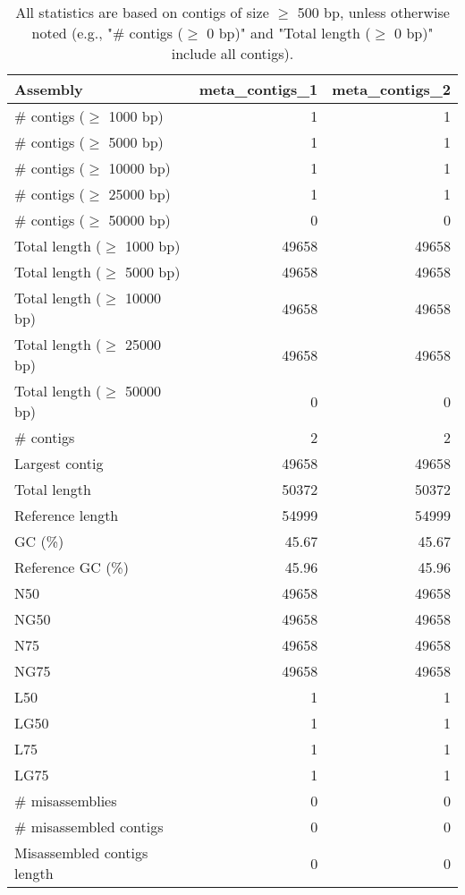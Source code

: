 \documentclass[12pt,a4paper]{article}
\begin{document}
\begin{table}[ht]
\begin{center}
\caption{All statistics are based on contigs of size $\geq$ 500 bp, unless otherwise noted (e.g., "\# contigs ($\geq$ 0 bp)" and "Total length ($\geq$ 0 bp)" include all contigs).}
\begin{tabular}{|l*{2}{|r}|}
\hline
Assembly & meta\_contigs\_1 & meta\_contigs\_2 \\ \hline
\# contigs ($\geq$ 1000 bp) & 1 & 1 \\ \hline
\# contigs ($\geq$ 5000 bp) & 1 & 1 \\ \hline
\# contigs ($\geq$ 10000 bp) & 1 & 1 \\ \hline
\# contigs ($\geq$ 25000 bp) & 1 & 1 \\ \hline
\# contigs ($\geq$ 50000 bp) & 0 & 0 \\ \hline
Total length ($\geq$ 1000 bp) & 49658 & 49658 \\ \hline
Total length ($\geq$ 5000 bp) & 49658 & 49658 \\ \hline
Total length ($\geq$ 10000 bp) & 49658 & 49658 \\ \hline
Total length ($\geq$ 25000 bp) & 49658 & 49658 \\ \hline
Total length ($\geq$ 50000 bp) & 0 & 0 \\ \hline
\# contigs & 2 & 2 \\ \hline
Largest contig & 49658 & 49658 \\ \hline
Total length & 50372 & 50372 \\ \hline
Reference length & 54999 & 54999 \\ \hline
GC (\%) & 45.67 & 45.67 \\ \hline
Reference GC (\%) & 45.96 & 45.96 \\ \hline
N50 & 49658 & 49658 \\ \hline
NG50 & 49658 & 49658 \\ \hline
N75 & 49658 & 49658 \\ \hline
NG75 & 49658 & 49658 \\ \hline
L50 & 1 & 1 \\ \hline
LG50 & 1 & 1 \\ \hline
L75 & 1 & 1 \\ \hline
LG75 & 1 & 1 \\ \hline
\# misassemblies & 0 & 0 \\ \hline
\# misassembled contigs & 0 & 0 \\ \hline
Misassembled contigs length & 0 & 0 \\ \hline

\end{tabular}
\end{center}
\end{table}
\end{document}
